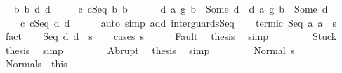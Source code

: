 \begin{isabellebody}
\ \isamarkupfalse%
\ b{}\ b{}\ d{}\ d{}\ \isanewline
\ \ \ \ c{}{\isacharcolon}\ {\isachardoublequoteopen}c{}{\isacharequal}Seq\ b{}\ b{}{\isachardoublequoteclose}\ \ \isanewline
\ \ \ \ d{}{\isacharcolon}\ {\isachardoublequoteopen}{\isacharparenleft}a{}\ {\isasyminter}\isactrlsub g\ b{}{\isacharparenright}\ {\isacharequal}\ Some\ d{}{\isachardoublequoteclose}\ \ d{}{\isacharcolon}\ {\isachardoublequoteopen}{\isacharparenleft}a{}\ {\isasyminter}\isactrlsub g\ b{}{\isacharparenright}\ {\isacharequal}\ Some\ d{}{\isachardoublequoteclose}\ \isanewline
\ \ \ \ c{\isacharcolon}\ {\isachardoublequoteopen}c{\isacharequal}Seq\ d{}\ d{}{\isachardoublequoteclose}\isanewline
\ \ \ \ \isamarkupfalse%
\ {\isacharparenleft}auto\ simp\ add{\isacharcolon}\ inter{\isacharunderscore}guards{\isacharunderscore}Seq{\isacharparenright}\isanewline
\ \ \isamarkupfalse%
\ termi{\isacharunderscore}c{}{\isacharcolon}\ {\isachardoublequoteopen}{\isasymGamma}{\isasymturnstile}Seq\ a{}\ a{}\ {\isasymdown}\ s{\isachardoublequoteclose}\ \isamarkupfalse%
\ fact\isanewline
\ \ \isamarkupfalse%
\ {\isachardoublequoteopen}{\isasymGamma}{\isasymturnstile}Seq\ d{}\ d{}\ {\isasymdown}\ s{\isachardoublequoteclose}\isanewline
\ \ \isamarkupfalse%
\ {\isacharparenleft}cases\ s{\isacharparenright}\isanewline
\ \ \ \ \isamarkupfalse%
\ Fault\ \isamarkupfalse%
\ {\isacharquery}thesis\ \isamarkupfalse%
\ simp\isanewline
\ \ \isamarkupfalse%
\isanewline
\ \ \ \ \isamarkupfalse%
\ Stuck\ \isamarkupfalse%
\ {\isacharquery}thesis\ \isamarkupfalse%
\ simp\isanewline
\ \ \isamarkupfalse%
\isanewline
\ \ \ \ \isamarkupfalse%
\ Abrupt\ \isamarkupfalse%
\ {\isacharquery}thesis\ \isamarkupfalse%
\ simp\isanewline
\ \ \isamarkupfalse%
\isanewline
\ \ \ \ \isamarkupfalse%
\ {\isacharparenleft}Normal\ s{\isacharprime}{\isacharparenright}\isanewline
\ \ \ \ \isamarkupfalse%
\ Normal{\isacharunderscore}s\ {\isacharequal}\ this\isanewline
\ \ \ \ \isamarkupfalse%

\end{isabellebody}

